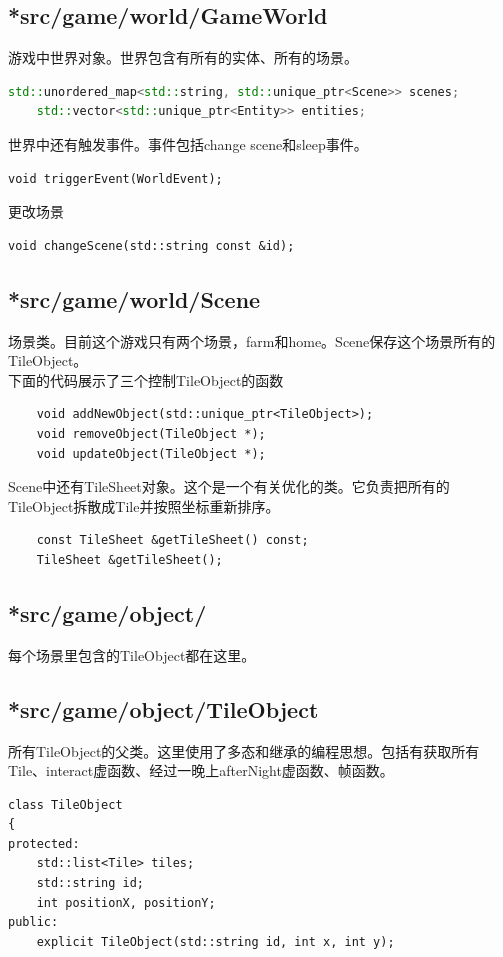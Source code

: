 \documentclass[a4paper,12pt]{report}
\begin{document}
\begin{spacing}{1.5}
\subsection{\textbf{*src/game/world/GameWorld}}
游戏中世界对象。世界包含有所有的实体、所有的场景。
\begin{lstlisting}[language={C++}]
std::unordered_map<std::string, std::unique_ptr<Scene>> scenes;
    std::vector<std::unique_ptr<Entity>> entities;
\end{lstlisting}
世界中还有触发事件。事件包括change scene和sleep事件。
\begin{lstlisting}
void triggerEvent(WorldEvent);
\end{lstlisting}
更改场景
\begin{lstlisting}
void changeScene(std::string const &id);
\end{lstlisting}
\subsection{\textbf{*src/game/world/Scene}}
场景类。目前这个游戏只有两个场景，farm和home。Scene保存这个场景所有的TileObject。\\
下面的代码展示了三个控制TileObject的函数
\begin{lstlisting}
    void addNewObject(std::unique_ptr<TileObject>);
    void removeObject(TileObject *);
    void updateObject(TileObject *);
\end{lstlisting}
Scene中还有TileSheet对象。这个是一个有关优化的类。它负责把所有的TileObject拆散成Tile并按照坐标重新排序。
\begin{lstlisting}
    const TileSheet &getTileSheet() const;
    TileSheet &getTileSheet();
\end{lstlisting}
\subsection{\textbf{*src/game/object/}}
每个场景里包含的TileObject都在这里。
\subsection{\textbf{*src/game/object/TileObject}}
所有TileObject的父类。这里使用了多态和继承的编程思想。包括有获取所有Tile、interact虚函数、经过一晚上afterNight虚函数、帧函数。
\begin{lstlisting}
class TileObject
{
protected:
    std::list<Tile> tiles;
    std::string id;
    int positionX, positionY;
public:
    explicit TileObject(std::string id, int x, int y);


\end{lstlisting}
\end{spacing}
\end{document}
